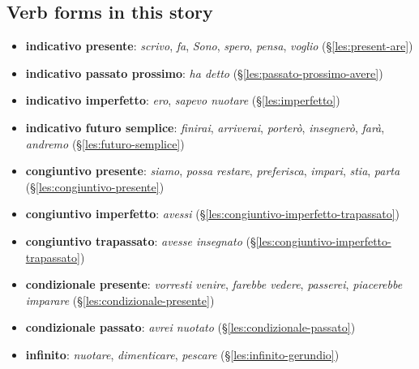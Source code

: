 \documentclass[11pt,a4paper,twoside,openright]{book}
\begin{document}
\subsection*{Verb forms in this story}
\begin{itemize}
\item\relax \textbf{indicativo presente}: \textit{scrivo}, \textit{fa}, \textit{Sono}, \textit{spero}, \textit{pensa}, \textit{voglio} (\S\ref{les:present-are})
\item\relax \textbf{indicativo passato prossimo}: \textit{ha detto} (\S\ref{les:passato-prossimo-avere})
\item\relax \textbf{indicativo imperfetto}: \textit{ero}, \textit{sapevo nuotare} (\S\ref{les:imperfetto})
\item\relax \textbf{indicativo futuro semplice}: \textit{finirai}, \textit{arriverai}, \textit{porterò}, \textit{insegnerò}, \textit{farà}, \textit{andremo} (\S\ref{les:futuro-semplice})
\item\relax \textbf{congiuntivo presente}: \textit{siamo}, \textit{possa restare}, \textit{preferisca}, \textit{impari}, \textit{stia}, \textit{parta} (\S\ref{les:congiuntivo-presente})
\item\relax \textbf{congiuntivo imperfetto}: \textit{avessi} (\S\ref{les:congiuntivo-imperfetto-trapassato})
\item\relax \textbf{congiuntivo trapassato}: \textit{avesse insegnato} (\S\ref{les:congiuntivo-imperfetto-trapassato})
\item\relax \textbf{condizionale presente}: \textit{vorresti venire}, \textit{farebbe vedere}, \textit{passerei}, \textit{piacerebbe imparare} (\S\ref{les:condizionale-presente})
\item\relax \textbf{condizionale passato}: \textit{avrei nuotato} (\S\ref{les:condizionale-passato})
\item\relax \textbf{infinito}: \textit{nuotare}, \textit{dimenticare}, \textit{pescare} (\S\ref{les:infinito-gerundio})
\end{itemize}
\end{document}
